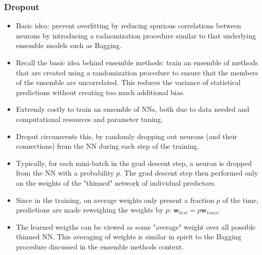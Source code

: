 \documentclass[norsk,a4paper,11pt]{article}
\begin{document}
\subsubsection{Dropout}
\begin{itemize}
	\item Basic idea: prevent overfitting by reducing spurious correlations between neurons by introducing a radnomization procedure similar to that underlying ensemble models such as Bagging.
	\item Recall the basic idea behind ensemble methods: train an ensemble of methods that are created using a randomization procedure to ensure that the members of the ensemble are uncorrelated. This reduces the variance of statistical predictions without creating too much additional bias.
	\item Extremly costly to train an ensemble of NNs, both due to data needed and computational resources and parameter tuning. 
	\item Droput circumvents this, by randomly dropping out neurons (and their connections) from the NN during each step of the training.
	\item Typically, for each mini-batch in the grad descent step, a neuron is dropped from the NN with a probability $p$. The grad descent step then performed only on the weights of the "thinned" network of individual predictors. 
	\item Since in the training, on average weights only present a fraction $p$ of the time, predictions are made reweighing the weights by $p$: $\bm{w}_{test} = p \bm{w}_{train}$. 
	\item The learned weigths can be viewed as some "average" weight over all possible thinned NN. This averaging of weights is similar in spirit to the Bagging procedure discussed in the ensemble methods context.
\end{itemize}
\end{document}
